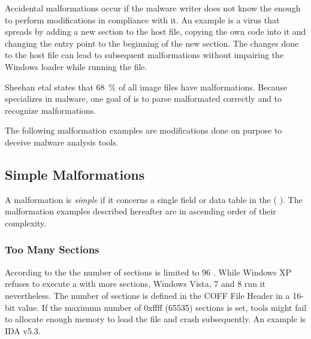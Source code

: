 Accidental malformations occur if the malware writer does not know the \PECOFF{} enough to perform modifications in compliance with it. An example is a virus that spreads by adding a new section to the host file, copying the own code into it and changing the entry point to the beginning of the new section. The changes done to the host file can lead to subsequent malformations without impairing the Windows loader while running the file.

Sheehan et\thinspace{}al states that 68~\% of all image files have malformations. \cite[slide 7]{sheehan07}
Because \portex{} specializes in \PE{} malware, one goal of \portex{} is to parse malformated  correctly and to recognize malformations.


The following malformation examples are modifications done on purpose to deceive malware analysis tools.

\subsection{Simple Malformations}

A malformation is \emph{simple} if it concerns a single field or data table in the \PE{} (\cf{} \cite[slide 7]{vuksan11}).
The malformation examples described hereafter are in ascending order of their complexity. 

\subsubsection*{Too Many Sections}

According to the \PECOFF{} the number of sections is limited to 96 \cite[]{pespec}. While Windows XP refuses to execute a \PE{} with more sections, Windows Vista, 7 and 8 run it nevertheless. The number of sections is defined in the COFF File Header in a 16-bit value. If the maximum number of 0xffff (65535) sections is set, tools might fail to allocate enough memory to load the file and crash subsequently. An example is IDA v5.3.

